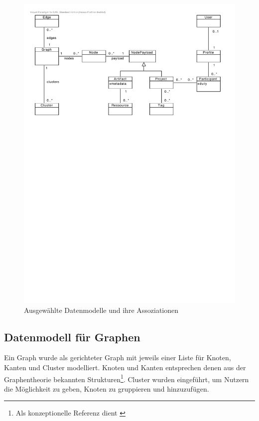 \begin{figure}[h]  
  \centering     
  \includegraphics[width=1.0\textwidth]{img/models.pdf}  
   \caption{Ausgewählte Datenmodelle und ihre Assoziationen}
  \label{fig:models} 
\end{figure}

\subsection{Datenmodell für Graphen}
Ein Graph wurde als gerichteter Graph mit jeweils einer Liste für Knoten, Kanten und Cluster modelliert. Knoten und Kanten entsprechen denen aus der Graphentheorie bekannten Strukturen\footnote{Als konzeptionelle Referenz dient \cite[p.~531]{corman}}.  Cluster wurden eingeführt, um Nutzern die Möglichkeit zu geben, Knoten zu gruppieren und  hinzuzufügen.

